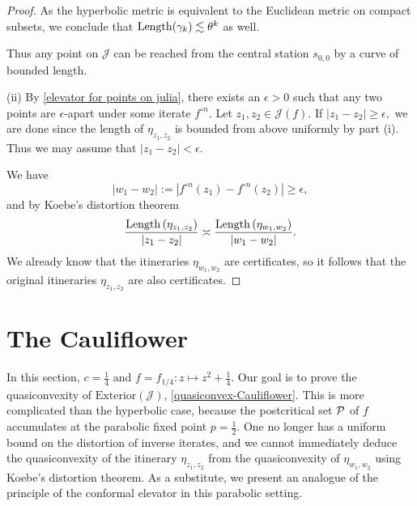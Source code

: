 \begin{proof}
As the hyperbolic metric is equivalent to the Euclidean metric on compact subsets, 
we conclude that $\operatorname{Length}(\gamma_k) \lesssim \theta^k$ as well.

Thus any point on $\mathcal J$ can be reached from the central station $s_{0,0}$ by a curve of bounded length.

(ii) By \cref{elevator for points on julia}, there exists an $\epsilon>0$ such that any two points are $\epsilon$-apart under some iterate $f^{\circ n}$. 
Let $z_{1},z_{2}\in\mathcal{J}(f)$. If $\left|z_{1}-z_{2}\right|\geq\epsilon,$ 
we are done since the length of $\eta_{z_1,z_2}$ is bounded from above uniformly by part (i).
Thus we may assume that 
$\left|z_{1}-z_{2}\right|<\epsilon$. 

We have 
\begin{equation}
	|w_1-w_2|:=\left|f^{\circ n}(z_{1})-f^{\circ n}(z_{2})\right|\geq\epsilon,
\end{equation}
and by Koebe's distortion theorem
\begin{equation}
	\frac{\operatorname{Length}\left(\eta_{z_{1},z_{2}}\right)}{|z_1-z_2|}\asymp\frac{\operatorname{Length}\left(\eta_{w_1,w_2}\right)}{|w_1-w_2|}.
\end{equation}
We already know that the itineraries $\eta_{w_1,w_2}$ are certificates, 
so it follows that the original itineraries $\eta_{z_1, z_2}$ are also certificates. 
\end{proof}

\section{The Cauliflower}
In this section, $c=\frac 14$ and $f=f_{1/4}: z\mapsto z^2+ \frac 14$.
Our goal is to prove the quasiconvexity of $\mathrm{Exterior}(\mathcal{J})$, \cref{quasiconvex-Cauliflower}. 
This is more complicated than the hyperbolic case, 
because the postcritical set $\operatorname{\mathcal P}$ of $f$ accumulates at the parabolic fixed point $p=\frac 12$. 
One no longer has a uniform bound on the distortion of inverse iterates, 
and we cannot immediately deduce the quasiconvexity of the itinerary $\eta_{z_1,z_2}$ from the quasiconvexity of $\eta_{w_1,w_2}$ using Koebe's distortion theorem. 
As a substitute, we present an analogue of the principle of the conformal elevator in this parabolic setting.

